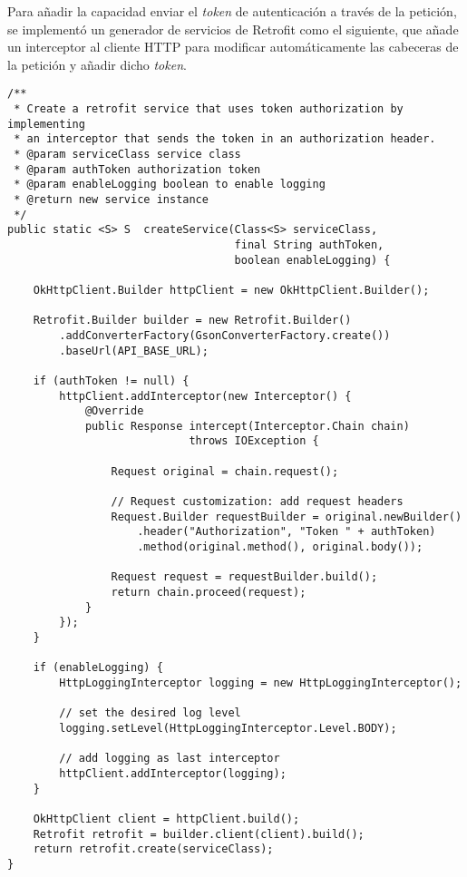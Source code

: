 Para añadir la capacidad enviar el \textit{token} de autenticación a través de
la petición, se implementó un generador de servicios de Retrofit como el
siguiente, que añade un interceptor al cliente HTTP para modificar
automáticamente las cabeceras de la petición y añadir dicho \textit{token}.


\begin{verbatim}
/**
 * Create a retrofit service that uses token authorization by implementing
 * an interceptor that sends the token in an authorization header.
 * @param serviceClass service class
 * @param authToken authorization token
 * @param enableLogging boolean to enable logging
 * @return new service instance
 */
public static <S> S  createService(Class<S> serviceClass,
                                   final String authToken,
                                   boolean enableLogging) {

    OkHttpClient.Builder httpClient = new OkHttpClient.Builder();

    Retrofit.Builder builder = new Retrofit.Builder()
        .addConverterFactory(GsonConverterFactory.create())
        .baseUrl(API_BASE_URL);

    if (authToken != null) {
        httpClient.addInterceptor(new Interceptor() {
            @Override
            public Response intercept(Interceptor.Chain chain)
                            throws IOException {
              
                Request original = chain.request();

                // Request customization: add request headers
                Request.Builder requestBuilder = original.newBuilder()
                    .header("Authorization", "Token " + authToken)
                    .method(original.method(), original.body());

                Request request = requestBuilder.build();
                return chain.proceed(request);
            }
        });
    }

    if (enableLogging) {
        HttpLoggingInterceptor logging = new HttpLoggingInterceptor();

        // set the desired log level
        logging.setLevel(HttpLoggingInterceptor.Level.BODY);

        // add logging as last interceptor
        httpClient.addInterceptor(logging);
    }

    OkHttpClient client = httpClient.build();
    Retrofit retrofit = builder.client(client).build();
    return retrofit.create(serviceClass);
}
\end{verbatim}

